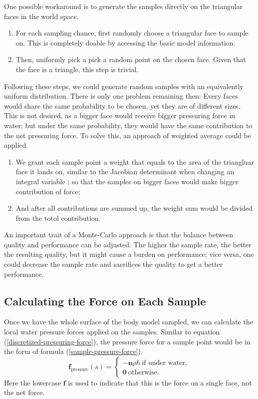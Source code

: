 One possible workaround is to generate the samples directly on the triangular faces in the world space.
\begin{enumerate}
	\item For each sampling chance, first randomly choose a triangular face to sample on.
		This is completely doable by accessing the basic model information.
	\item Then, uniformly pick a pick a random point on the chosen face.
		Given that the face is a triangle, this step is trivial.
\end{enumerate}

Following these steps, we could generate random samples with an equivalently uniform distribution.
There is only one problem remaining then:
Every faces would share the same probability to be chosen, yet they are of different sizes.
This is not desired, as a bigger face would receive bigger pressuring force in water;
but under the same probability, they would have the same contribution to the net pressuring force.
To solve this, an approach of weighted average could be applied.
\begin{enumerate}
	\item We grant each sample point a weight that equals to the area of the triangluar face it lands on, similar to the Jacobian determinant when changing an integral variable \cite{waldron1985study};
	so that the samples on bigger faces would make bigger contribution of force;
	\item And after all contributions are summed up, the weight sum would be divided from the totol contribution.
\end{enumerate}

An important trait of a Monte-Carlo approach is that the balance between quality and performance can be adjusted.
The higher the sample rate, the better the resulting quality, but it might cause a burden on performance;
vice versa, one could decrease the sample rate and sacrifices the quality to get a better performance.

\subsection{Calculating the Force on Each Sample}

Once we have the whole surface of the body model sampled, we can calculate the local water pressure forces applied on the samples.
Similar to equation (\ref{discretized-pressuring-force}), the pressure force for a sample point would be in the form of formula (\ref{sample-pressure-force}).
\begin{equation}
	\mathbf{f}_{\text{pressure}}(s)=
	\begin{cases}
		-\mathbf{n}\rho h \ \text{if under water}, \\
		\mathbf{0} \ \text{otherwise}.
	\end{cases}
	\label{sample-pressure-force}
\end{equation}
Here the lowercase $\mathbf{f}$ is used to indicate that this is the force on a single face, not the net force.

